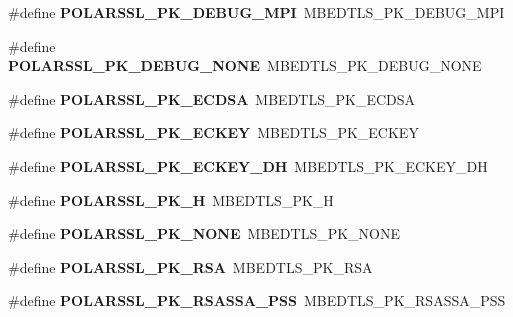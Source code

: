 \begin{DoxyCompactItemize}
\#define {\bfseries P\+O\+L\+A\+R\+S\+S\+L\+\_\+\+P\+K\+\_\+\+D\+E\+B\+U\+G\+\_\+\+M\+PI}~M\+B\+E\+D\+T\+L\+S\+\_\+\+P\+K\+\_\+\+D\+E\+B\+U\+G\+\_\+\+M\+PI
\item 
\mbox{\label{compat-1_83_8h_af9201f1c33c9b1a3ee3d083e87442ffd}} 
\#define {\bfseries P\+O\+L\+A\+R\+S\+S\+L\+\_\+\+P\+K\+\_\+\+D\+E\+B\+U\+G\+\_\+\+N\+O\+NE}~M\+B\+E\+D\+T\+L\+S\+\_\+\+P\+K\+\_\+\+D\+E\+B\+U\+G\+\_\+\+N\+O\+NE
\item 
\mbox{\label{compat-1_83_8h_af093d558576b401965446719d746f0d4}} 
\#define {\bfseries P\+O\+L\+A\+R\+S\+S\+L\+\_\+\+P\+K\+\_\+\+E\+C\+D\+SA}~M\+B\+E\+D\+T\+L\+S\+\_\+\+P\+K\+\_\+\+E\+C\+D\+SA
\item 
\mbox{\label{compat-1_83_8h_a1116c7a469468ab1e66a75108e1cbc35}} 
\#define {\bfseries P\+O\+L\+A\+R\+S\+S\+L\+\_\+\+P\+K\+\_\+\+E\+C\+K\+EY}~M\+B\+E\+D\+T\+L\+S\+\_\+\+P\+K\+\_\+\+E\+C\+K\+EY
\item 
\mbox{\label{compat-1_83_8h_a3b297724f2e067067b27608182f2b0c0}} 
\#define {\bfseries P\+O\+L\+A\+R\+S\+S\+L\+\_\+\+P\+K\+\_\+\+E\+C\+K\+E\+Y\+\_\+\+DH}~M\+B\+E\+D\+T\+L\+S\+\_\+\+P\+K\+\_\+\+E\+C\+K\+E\+Y\+\_\+\+DH
\item 
\mbox{\label{compat-1_83_8h_ab55c0c221c25b7b2fba3837c2cac8e38}} 
\#define {\bfseries P\+O\+L\+A\+R\+S\+S\+L\+\_\+\+P\+K\+\_\+H}~M\+B\+E\+D\+T\+L\+S\+\_\+\+P\+K\+\_\+H
\item 
\mbox{\label{compat-1_83_8h_a9ce1fc64494eec6c5fa5d10fb29cb146}} 
\#define {\bfseries P\+O\+L\+A\+R\+S\+S\+L\+\_\+\+P\+K\+\_\+\+N\+O\+NE}~M\+B\+E\+D\+T\+L\+S\+\_\+\+P\+K\+\_\+\+N\+O\+NE
\item 
\mbox{\label{compat-1_83_8h_a4816d2741aac7e4869ac397c4eebfa4e}} 
\#define {\bfseries P\+O\+L\+A\+R\+S\+S\+L\+\_\+\+P\+K\+\_\+\+R\+SA}~M\+B\+E\+D\+T\+L\+S\+\_\+\+P\+K\+\_\+\+R\+SA
\item 
\mbox{\label{compat-1_83_8h_a414e8174b06ba76dcf1affeab90cdf5c}} 
\#define {\bfseries P\+O\+L\+A\+R\+S\+S\+L\+\_\+\+P\+K\+\_\+\+R\+S\+A\+S\+S\+A\+\_\+\+P\+SS}~M\+B\+E\+D\+T\+L\+S\+\_\+\+P\+K\+\_\+\+R\+S\+A\+S\+S\+A\+\_\+\+P\+SS

\end{DoxyCompactItemize}
